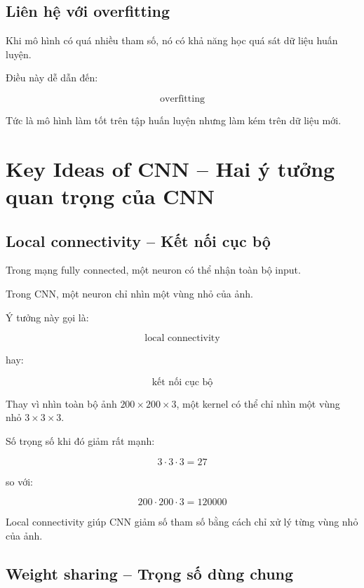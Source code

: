 \subsection{Liên hệ với overfitting}

Khi mô hình có quá nhiều tham số, nó có khả năng học quá sát dữ liệu huấn luyện.

Điều này dễ dẫn đến:

\[
    \text{overfitting}
\]

Tức là mô hình làm tốt trên tập huấn luyện nhưng làm kém trên dữ liệu mới.

\section{Key Ideas of CNN -- Hai ý tưởng quan trọng của CNN}

\subsection{Local connectivity -- Kết nối cục bộ}

Trong mạng fully connected, một neuron có thể nhận toàn bộ input.

Trong CNN, một neuron chỉ nhìn một vùng nhỏ của ảnh.

Ý tưởng này gọi là:

\[
    \text{local connectivity}
\]

hay:

\[
    \text{kết nối cục bộ}
\]

\begin{vidu}
Thay vì nhìn toàn bộ ảnh $200 \times 200 \times 3$, một kernel có thể chỉ nhìn một vùng nhỏ $3 \times 3 \times 3$.
\end{vidu}

Số trọng số khi đó giảm rất mạnh:

\[
    3 \cdot 3 \cdot 3 = 27
\]

so với:

\[
    200 \cdot 200 \cdot 3 = 120000
\]

\begin{ghinho}
Local connectivity giúp CNN giảm số tham số bằng cách chỉ xử lý từng vùng nhỏ của ảnh.
\end{ghinho}

\subsection{Weight sharing -- Trọng số dùng chung}

